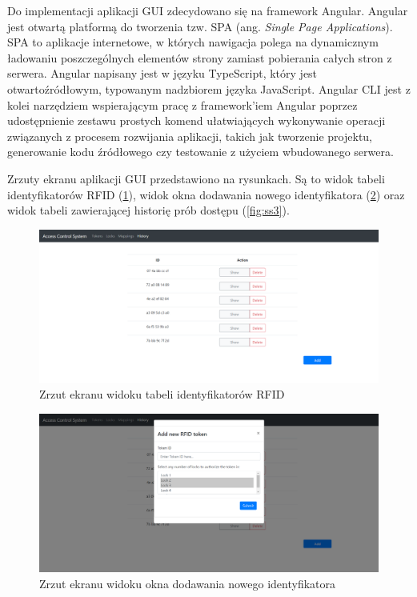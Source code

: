 			Do implementacji aplikacji GUI zdecydowano się na framework Angular. Angular jest otwartą platformą do tworzenia tzw. SPA (ang. \textit{Single Page Applications}). SPA to aplikacje internetowe, w których nawigacja polega na dynamicznym ładowaniu poszczególnych elementów strony zamiast pobierania całych stron z serwera. Angular napisany jest w języku TypeScript, który jest otwartoźródłowym, typowanym nadzbiorem języka JavaScript. Angular CLI jest z kolei narzędziem wspierającym pracę z framework'iem Angular poprzez udostępnienie zestawu prostych komend ułatwiających wykonywanie operacji związanych z procesem rozwijania aplikacji, takich jak tworzenie projektu, generowanie kodu źródłowego czy testowanie z użyciem wbudowanego serwera.

			Zrzuty ekranu aplikacji GUI przedstawiono na rysunkach. Są to widok tabeli identyfikatorów RFID (\ref{fig:ss1}), widok okna dodawania nowego identyfikatora (\ref{fig:ss2}) oraz widok tabeli zawierającej historię prób dostępu (\ref{fig:ss3}).

			\begin{figure}[]
	            \centering
	            \includegraphics[width=\textwidth, frame]{chapters/images/ss1.png}
	            \caption{Zrzut ekranu widoku tabeli identyfikatorów RFID}
	            \label{fig:ss1}
	        \end{figure}

	        \begin{figure}[]
	            \centering
	            \includegraphics[width=\textwidth]{chapters/images/ss2.png}
	            \caption{Zrzut ekranu widoku okna dodawania nowego identyfikatora}
	            \label{fig:ss2}
	        \end{figure}


